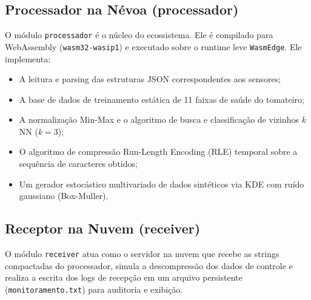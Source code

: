 \documentclass[
	12pt,
	openright,
	oneside,
	a4paper,
	english,
	brazil
	]{abntex2}
\begin{document}
\subsection{Processador na Névoa (processador)}
O módulo \texttt{processador} é o núcleo do ecossistema. Ele é compilado para WebAssembly (\texttt{wasm32-wasip1}) e executado sobre o runtime leve \texttt{WasmEdge}. Ele implementa:
\begin{itemize}
    \item A leitura e parsing das estruturas JSON correspondentes aos sensores;
    \item A base de dados de treinamento estática de 11 faixas de saúde do tomateiro;
    \item A normalização Min-Max e o algoritmo de busca e classificação de vizinhos $k$NN ($k=3$);
    \item O algoritmo de compressão Run-Length Encoding (RLE) temporal sobre a sequência de caracteres obtidos;
    \item Um gerador estocástico multivariado de dados sintéticos via KDE com ruído gaussiano (Box-Muller).
\end{itemize}

\subsection{Receptor na Nuvem (receiver)}
O módulo \texttt{receiver} atua como o servidor na nuvem que recebe as strings compactadas do processador, simula a descompressão dos dados de controle e realiza a escrita dos logs de recepção em um arquivo persistente (\texttt{monitoramento.txt}) para auditoria e exibição.
\end{document}
